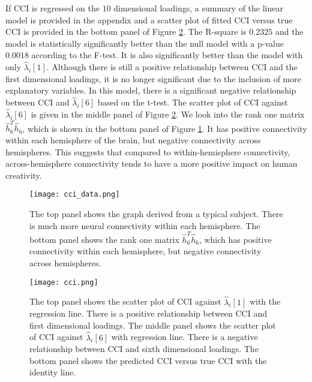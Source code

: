 \documentclass[10pt,journal,compsoc]{IEEEtran}
\begin{document}
\noindent If CCI is regressed on the $10$ dimensional loadings, a summary of the linear model is provided in the appendix and a scatter plot of fitted CCI versus true CCI is provided in the bottom panel of Figure \ref{fig:cci}. The R-square is $0.2325$ and the model is statistically significantly better than the null model with a p-value $0.0018$ according to the F-test. It is also significantly better than the model with only $\hat{\lambda}_i[1]$. Although there is still a positive relationship between CCI and the first dimensional loadings, it is no longer significant due to the inclusion of more explanatory variables. In this model, there is a significant negative relationship between CCI and $\hat{\lambda}_i[6]$ based on the t-test. The scatter plot of CCI against $\hat{\lambda}_i[6]$ is given in the middle panel of Figure \ref{fig:cci}. We look into the rank one matrix $\hat{h}_6^T\hat{h}_6$, which is shown in the bottom panel of Figure \ref{fig:cci1}. It has positive connectivity within each hemisphere of the brain, but negative connectivity across hemispheres. This suggests that compared to within-hemisphere connectivity, across-hemisphere connectivity tends to have a more positive impact on human creativity. 

\begin{figure}[!htbp]
	\centering
	\texttt{[image: cci\_data.png]}
	\caption{The top panel shows the graph derived from a typical subject. There is much more neural connectivity within each hemisphere. The bottom panel shows the rank one matrix $\hat{h}_6^T\hat{h}_6$, which has positive  connectivity within each hemisphere, but negative  connectivity across hemispheres.  }
	\label{fig:cci1}
\end{figure} 

\begin{figure}[!htbp]
	\centering
	\texttt{[image: cci.png]}
	\caption{The top panel shows the scatter plot of CCI against $\hat{\lambda}_i[1]$ with the regression line. There is a positive relationship between CCI and first dimensional loadings. The middle panel shows the scatter plot of CCI against $\hat{\lambda}_i[6]$ with regression line. There is a negative relationship between CCI and sixth dimensional loadings. The bottom panel shows the predicted CCI versus true CCI with the identity line.}
	\label{fig:cci}
\end{figure}
\end{document}
